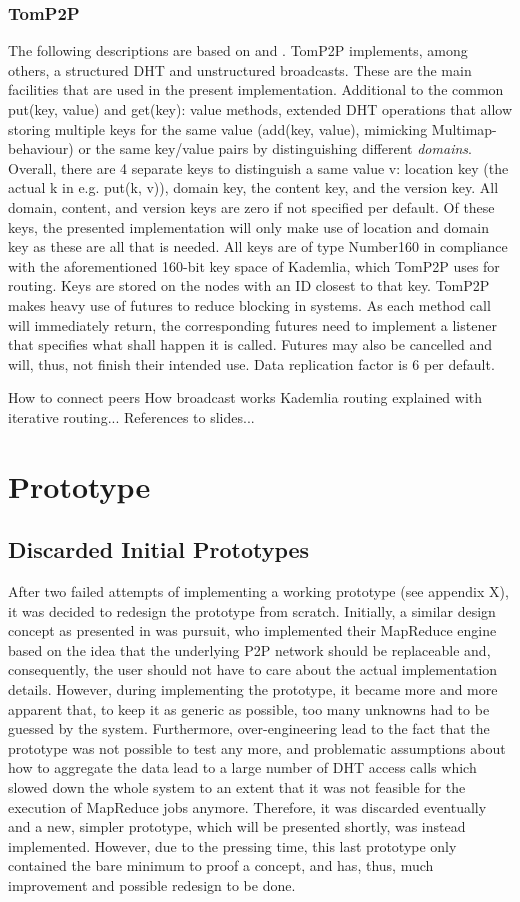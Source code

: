 \subsubsection{TomP2P}
The following descriptions are based on \cite{BocekDHT} and \cite{TomP2P}. TomP2P implements, among others, a structured DHT and unstructured broadcasts. These are the main facilities that are used in the present implementation. Additional to the common put(key, value) and get(key): value methods, extended DHT operations that allow storing multiple keys for the same value (add(key, {value}), mimicking Multimap-behaviour) or the same key/value pairs by distinguishing different \textit{domains}. Overall, there are 4 separate keys to distinguish a same value v: location key (the actual k in e.g. put(k, v)), domain key, the content key, and the version key. All domain, content, and version keys are zero if not specified per default. Of these keys, the presented implementation will only make use of location and domain key as these are all that is needed. All keys are of type Number160 in compliance with the aforementioned 160-bit key space of Kademlia, which TomP2P uses for routing. Keys are stored on the nodes with an ID closest to that key. TomP2P makes heavy use of futures to reduce blocking in systems. As each method call will immediately return, the corresponding futures need to implement a listener that specifies what shall happen it is called. Futures may also be cancelled and will, thus, not finish their intended use. Data replication factor is 6 per default.

How to connect peers
How broadcast works
Kademlia routing explained with iterative routing...
References to slides...
\section{Prototype}
\subsection{Discarded Initial Prototypes}
After two failed attempts of implementing a working prototype (see appendix X), it was decided to redesign the prototype from scratch. Initially, a similar design concept as presented in \cite{Steffenel2015} was pursuit, who implemented their MapReduce engine based on the idea that the underlying P2P network should be replaceable and, consequently, the user should not have to care about the actual implementation details. However, during implementing the prototype, it became more and more apparent that, to keep it as generic as possible, too many unknowns had to be guessed by the system. Furthermore, over-engineering lead to the fact that the prototype was not possible to test any more, and problematic assumptions about how to aggregate the data lead to a large number of DHT access calls which slowed down the whole system to an extent that it was not feasible for the execution of MapReduce jobs anymore. Therefore, it was discarded eventually and a new, simpler prototype, which will be presented shortly, was instead implemented. However, due to the pressing time, this last prototype only contained the bare minimum to proof a concept, and has, thus, much improvement and possible redesign to be done. 

